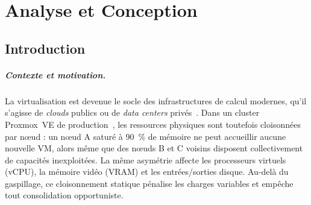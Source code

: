 
\chapter{Analyse et Conception}
\label{cp:analyse-conception}

\section*{Introduction}

\paragraph{Contexte et motivation.}
La virtualisation est devenue le socle des infrastructures de calcul modernes, qu'il s'agisse de \textit{clouds} publics ou de \textit{data centers} privés~\cite{verma_2015_borg}. Dans un cluster Proxmox~VE de production~\cite{proxmox_doc}, les ressources physiques sont toutefois cloisonnées par nœud : un nœud A saturé à 90~\% de mémoire ne peut accueillir aucune nouvelle VM, alors même que des nœuds B et C voisins disposent collectivement de capacités inexploitées. La même asymétrie affecte les processeurs virtuels (vCPU), la mémoire vidéo (VRAM) et les entrées/sorties disque. Au-delà du gaspillage, ce cloisonnement statique pénalise les charges variables et empêche tout consolidation opportuniste.

